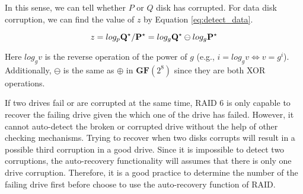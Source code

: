 In this sense, we can tell whether $P$ or $Q$ disk has corrupted. For data disk corruption, we can find the value of $z$ by Equation \ref{eq:detect_data}.

\begin{equation}\label{eq:detect_data}
	z = log_p{{\bf Q}^\star/{\bf P}^\star} = log_{g}{\bf Q}^\star\ominus log_{g}{\bf P}^\star
\end{equation}

Here $log_{g}v$ is the reverse operation of the power of $g$ (e.g., $i=log_{g}v\!\iff\!v=g^i$). Additionally, $\ominus$ is the same as $\oplus$ in $\mathbf{GF}(2^8)$ since they are both XOR operations.

If two drives fail or are corrupted at the same time, RAID 6 is only capable to recover the failing drive given the which one of the drive has failed. However, it cannot auto-detect the broken or corrupted drive without the help of other checking mechanisms. Trying to recover when two disks corrupts will result in a possible third corruption in a good drive. Since it is impossible to detect two corruptions, the auto-recovery functionality will assumes that there is only one drive corruption. Therefore, it is a good practice to determine the number of the failing drive first before choose to use the auto-recovery function of RAID.

